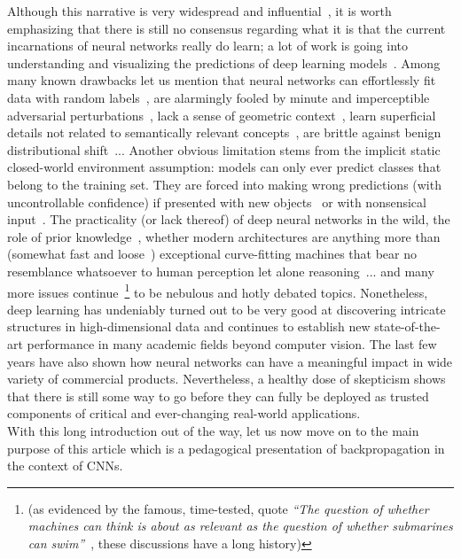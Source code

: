 \documentclass{article}
\begin{document}
\noindent Although this narrative is very widespread and influential~\cite{natureDeep}, it is worth emphasizing that there is still no consensus regarding what it is that the current incarnations of neural networks really do learn; a lot of work is going into understanding and visualizing the predictions of deep learning models~\cite{distill,explainLIME}.  Among many known drawbacks let us mention that neural networks can effortlessly fit data with random labels~\cite{generalize}, are alarmingly fooled by minute and imperceptible adversarial perturbations~\cite{intriguing}, lack a sense of geometric context~\cite{capsule}, learn superficial details not related to semantically relevant concepts~\cite{fftSuperficial}, are brittle against benign distributional shift~\cite{cifar10Generalize}...  Another obvious limitation stems from the implicit static closed-world environment assumption: models can only ever predict classes that belong to the training set.  They are forced into making wrong predictions (with uncontrollable confidence) if presented with new objects~\cite{openSet} or with nonsensical input~\cite{rubbishImages}. The practicality (or lack thereof) of deep neural networks in the wild, the role of prior knowledge~\cite{garyMarcus}, whether modern architectures are anything more than (somewhat fast and loose~\cite{fastLoose}) exceptional curve-fitting machines that bear no resemblance whatsoever to human perception let alone reasoning~\cite{pearl}... and many more issues continue~\footnote{(as evidenced by the famous, time-tested, quote {\it ``The question of whether machines can think is about as relevant as the question of whether submarines can swim''}~\cite{Dijkstra}, these discussions have a long history)} to be nebulous and hotly debated topics.  Nonetheless, deep learning has undeniably turned out to be very good at discovering intricate structures in high-dimensional data and continues to establish new state-of-the-art performance in many academic fields beyond computer vision. The last few years have also shown how neural networks can have a meaningful impact in wide variety of commercial products.  Nevertheless, a healthy dose of skepticism shows that there is still some way to go before they can fully be deployed as trusted components of critical and ever-changing real-world applications. \\

\noindent With this long introduction out of the way, let us now move on to the main purpose of this article which is a pedagogical presentation of backpropagation in the context of CNNs.
\end{document}
